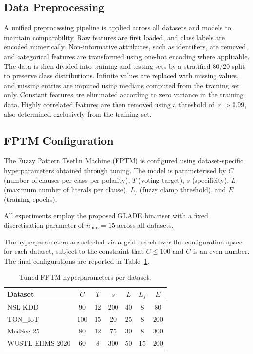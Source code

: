 \documentclass[journal,twoside,web]{ieeecolor}
\begin{document}
\subsection{Data Preprocessing}
\label{sec:preprocessing}

A unified preprocessing pipeline is applied across all datasets and
models to maintain comparability. Raw features are first loaded, and
class labels are encoded numerically. Non-informative attributes, such
as identifiers, are removed, and categorical features are transformed
using one-hot encoding where applicable. The data is then divided into
training and testing sets by a stratified 80/20 split to preserve class
distributions. Infinite values are replaced with missing values, and
missing entries are imputed using medians computed from the training
set only. Constant features are eliminated according to zero variance in
the training data. Highly correlated features are then removed using a
threshold of $|r| > 0.99$, also determined exclusively from the
training set.

\subsection{FPTM Configuration}
\label{sec:fptm-config}

The Fuzzy Pattern Tsetlin Machine (FPTM) is configured using
dataset-specific hyperparameters obtained through tuning.
The model is parameterised by $C$ (number of clauses per class per
polarity), $T$ (voting target), $s$ (specificity), $L$ (maximum number
of literals per clause), $L_f$ (fuzzy clamp threshold), and $E$
(training epochs).

All experiments employ the proposed GLADE binariser with a fixed
discretisation parameter of $n_{\text{bins}} = 15$ across all datasets.

The hyperparameters are selected via a grid search over the
configuration space for each dataset, subject to the constraint that
$C \leq 100$ and $C$ is an even number. The final configurations are
reported in Table~\ref{tab:tm_hparams}.

\begin{table}[t]
\centering
\caption{Tuned FPTM hyperparameters per dataset.}
\label{tab:tm_hparams}
\renewcommand{\arraystretch}{1.2}
\small
\begin{tabular}{|l|c|c|c|c|c|c|}
\hline
\textbf{Dataset} & $C$ & $T$ & $s$ & $L$ & $L_f$ & $E$ \\
\hline
NSL-KDD         & 90  & 12 & 200 & 40 & 8  & 80  \\
\hline
TON\_IoT        & 100 & 15 & 20  & 25 & 8  & 200 \\
\hline
MedSec-25       & 80  & 12 & 75  & 30 & 8  & 300 \\
\hline
WUSTL-EHMS-2020 & 60  & 8  & 300 & 50 & 15 & 200 \\
\hline
\end{tabular}
\end{table}
\end{document}
